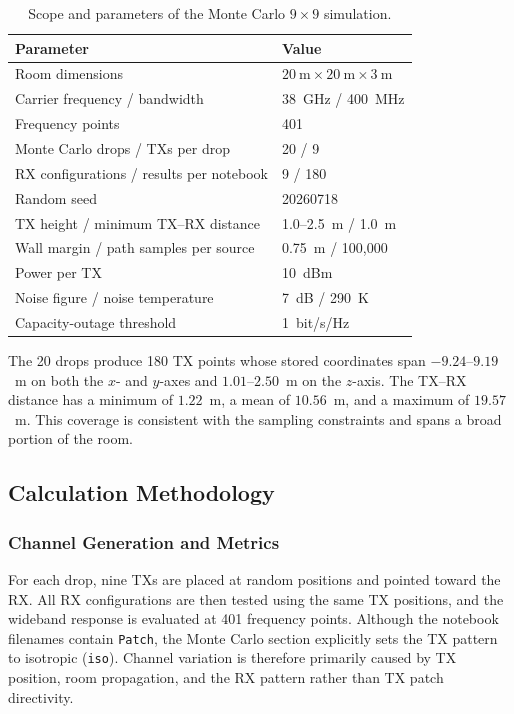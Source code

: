 \documentclass[10pt]{article}
\begin{document}
\begin{table}[H]
    \centering
    \caption{Scope and parameters of the Monte Carlo $9\times9$ simulation.}
    \label{tab:monte_carlo_scope}
    \small
    \begin{tabular}{ll}
        \hline
        \textbf{Parameter} & \textbf{Value} \\
        \hline
        Room dimensions & $20~\mathrm{m}\times20~\mathrm{m}\times3~\mathrm{m}$ \\
        Carrier frequency / bandwidth & 38~GHz / 400~MHz \\
        Frequency points & 401 \\
        Monte Carlo drops / TXs per drop & 20 / 9 \\
        RX configurations / results per notebook & 9 / 180 \\
        Random seed & 20260718 \\
        TX height / minimum TX--RX distance & 1.0--2.5~m / 1.0~m \\
        Wall margin / path samples per source & 0.75~m / 100,000 \\
        Power per TX & 10~dBm \\
        Noise figure / noise temperature & 7~dB / 290~K \\
        Capacity-outage threshold & 1~bit/s/Hz \\
        \hline
    \end{tabular}
\end{table}

The 20 drops produce 180 TX points whose stored coordinates span
$-9.24$--$9.19$~m on both the $x$- and $y$-axes and $1.01$--$2.50$~m on the
$z$-axis. The TX--RX distance has a minimum of $1.22$~m, a mean of
$10.56$~m, and a maximum of $19.57$~m. This coverage is consistent with the
sampling constraints and spans a broad portion of the room.

\subsection{Calculation Methodology}

\subsubsection{Channel Generation and Metrics}

For each drop, nine TXs are placed at random positions and pointed toward the
RX. All RX configurations are then tested using the same TX positions, and
the wideband response is evaluated at 401 frequency points. Although the
notebook filenames contain \texttt{Patch}, the Monte Carlo section explicitly
sets the TX pattern to isotropic (\texttt{iso}). Channel variation is
therefore primarily caused by TX position, room propagation, and the RX
pattern rather than TX patch directivity.
\end{document}
